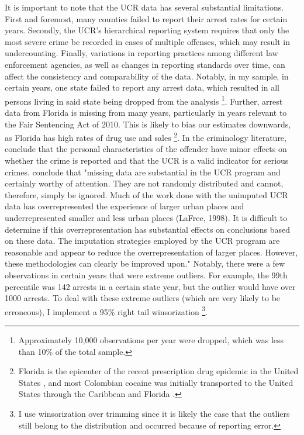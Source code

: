 \documentclass{article}
\begin{document}
It is important to note that the UCR data has several substantial limitations. First and foremost, many counties failed to report their arrest rates for certain years. Secondly, the UCR's hierarchical reporting system requires that only the most severe crime be recorded in cases of multiple offenses, which may result in undercounting. Finally, variations in reporting practices among different law enforcement agencies, as well as changes in reporting standards over time, can affect the consistency and comparability of the data. Notably, in my sample, in certain years, one state failed to report any arrest data, which resulted in all persons living in said state being dropped from the analysis \footnote{Approximately 10,000 observations per year were dropped, which was less than 10\% of the total sample.}. Further, arrest data from Florida is missing from many years, particularly in years relevant to the Fair Sentencing Act of 2010. This is likely to bias our estimates downwards, as Florida has high rates of drug use and sales \footnote{Florida is the epicenter of the recent prescription drug epidemic in the United States \citep{lee}, and most Colombian cocaine was initially transported to the United States through the Caribbean and Florida \citep{williams}.}. In the criminology literature, \cite{gove} conclude that the personal characteristics of the offender have minor effects on whether the crime is reported and that the UCR is a valid indicator for serious crimes. \cite{lynch} conclude that "missing data are substantial in the UCR program and certainly worthy of attention. They are not randomly distributed and cannot, therefore, simply be ignored. Much of the work done with the unimputed UCR data has overrepresented the experience of larger urban places and underrepresented smaller and less urban places (LaFree, 1998). It is difficult to determine if this overrepresentation has substantial effects on conclusions based on these data. The imputation strategies employed by the UCR program are reasonable and appear to reduce the overrepresentation of larger places. However, these methodologies can clearly be improved upon." Notably, there were a few observations in certain years that were extreme outliers. For example, the 99th percentile was 142 arrests in a certain state year, but the outlier would have over 1000 arrests. To deal with these extreme outliers (which are very likely to be erroneous), I implement a 95\% right tail winsorization \footnote{I use winsorization over trimming since it is likely the case that the outliers still belong to the distribution and occurred because of reporting error.}. 
\end{document}
